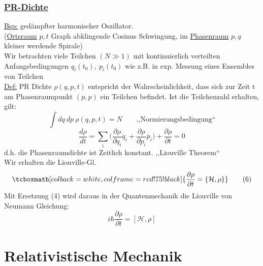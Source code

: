 \documentclass[titlepage,12pt,a4paper,ngerman]{report}
\newcommand{\tx}[1]{\textrm{#1}}
\newcommand{\ham}{\mathcal{H}}
\newcommand{\rmbox}[1]{\tcboxmath[colback=white,colframe=red!75!black]{#1}} %
\begin{document}
\subsection{\underline{PR-Dichte}}
\underline{Bsp:} gedämpfter harmonischer Oszillator.\\[5pt]
(\underline{Ortsraum} $ p,t $ Graph abklingende Cosinus Schwingung, im \underline{Phasenraum} $ p,q $ kleiner werdende Spirale)\\[5pt]
Wir betrachten viele Teilchen $ (N \gg 1) $ mit kontinuierlich verteilten Anfangsbedingungen $ q_i(t_0) ,\  p_i(t_0) $ wie z.B. in exp. Messung eines Ensembles von Teilchen\\[10pt]
\underline{Def:} PR Dichte $ \rho(q,p,t) $ entspricht der Wahrscheinlichkeit, dass sich zur Zeit t am Phasenraumpunkt $ (p,p) $ ein Teilchen befindet. Ist die Teilchenzahl erhalten, gilt:
\begin{equation*}
\int dq \ dp \ \rho(q,p,t) = N \qquad \tx{,,Normierungsbedingung``}
\end{equation*}
\begin{equation*}
\frac{d \rho}{d t} = \sum_i \bigg( \frac{\partial \rho}{\partial q_i} \dot{q}_i + \frac{\partial \rho}{\partial p_i} \dot{p_i} \bigg) + \frac{\partial \rho}{\partial t} = 0
\end{equation*}
d.h. die Phasenraumdichte ist Zeitlich konstant. ,,Liouville Theorem``\\[5pt]
Wir erhalten die Liouville-Gl.
\begin{equation*}
\rmbox{\frac{\partial \rho}{\partial t} = \{\ham , \rho\}} \tag{6}
\end{equation*}
Mit Ersetzung (4) wird daraus in der Quantenmechanik die Liouville von Neumann Gleichung:
\begin{equation*}
i \hbar \frac{\partial \rho}{\partial t} = [\ham, \rho] \tag{7}
\end{equation*}

\chapter{Relativistische Mechanik}
%
\end{document}
